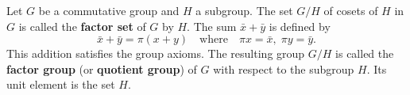 Let $G$ be a commutative group and $H$ a subgroup. The set $G/H$ of cosets of $H$ in $G$ is called the \textbf{factor set} of $G$ by $H$. The sum $\bar{x} + \bar{y}$ is defined by
$$\bar{x} + \bar{y} = \pi(x + y) \quad \text{where} \quad \pi x = \bar{x}, \; \pi y = \bar{y}.$$
This addition satisfies the group axioms. The resulting group $G/H$ is called the \textbf{factor group} (or \textbf{quotient group}) of $G$ with respect to the subgroup $H$. Its unit element is the set $H$.
